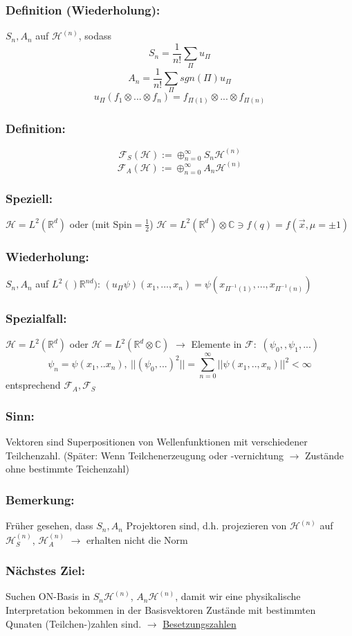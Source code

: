 \documentclass[twoside,a4paper]{scrartcl}
\newcommand{\R}{\mathbb{R}}
\newcommand{\C}{\mathbb{C}}
\renewcommand{\1}{\mathds{1}}
\newcommand{\ra}{\rightarrow}
\renewcommand{\H}{\mathcal{H}}
\newcommand{\F}{\mathcal{F}}
\renewcommand{\R}{\mathbb{R}}
\renewcommand{\C}{\mathbb{C}}
\begin{document}
\subsubsection*{Definition (Wiederholung):} 
$S_n, A_n$ auf $\H^{(n)}$, sodass 
$$S_n=\frac{1}{n!} \sum_\Pi u_\Pi$$
$$A_n=\frac{1}{n!} \sum_\Pi sgn(\Pi) u_\Pi$$
$$u_\Pi(f_1\otimes ... \otimes f_n)=f_{\Pi(1)}\otimes ... \otimes f_{\Pi(n)}$$
\subsubsection*{Definition:} 
$$\F_S(\H):=\oplus_{n=0}^\infty S_n \H^{(n)}$$
$$\F_A(\H):=\oplus_{n=0}^\infty A_n \H^{(n)}$$
\subsubsection*{Speziell:} 
$\H=L^2(\R^d)$ oder (mit Spin$=\frac{1}{2}$) $\H=L^2(\R^d)\otimes\C \ni f(q)=f(\vec x, \mu=\pm 1)$
\subsubsection*{Wiederholung:} 
$S_n,A_n$ auf $L^2()\R^{nd})$: $(u_\Pi\psi)(x_1,...,x_n)=\psi(x_{\Pi^{-1}(1)},...,x_{\Pi^{-1}(n)})$
\subsubsection*{Spezialfall:} 
$\H=L^2(\R^d)$ oder $\H=L^2(\R^d \otimes \C)$ $\ra$ Elemente in $\F:$ $(\psi_0,,\psi_1,...)$
$$\psi_n=\psi(x_1,..x_n), \ ||(\psi_0,...)^2||=\sum_{n=0}^\infty ||\psi(x_1,..,x_n)||^2 < \infty$$
entsprechend $\F_A, \F_S$
\subsubsection*{Sinn:} 
Vektoren sind Superpositionen von Wellenfunktionen mit verschiedener Teilchenzahl. (Später: Wenn Teilchenerzeugung oder -vernichtung $\ra$ Zustände ohne bestimmte Teichenzahl)
\subsubsection*{Bemerkung:} 
Früher gesehen, dass $S_n,A_n$ Projektoren sind, d.h. projezieren von $\H^{(n)}$ auf $\H^{(n)}_S$, $\H^{(n)}_A$ $\ra$ erhalten nicht die Norm
\subsubsection*{Nächstes Ziel:} 
Suchen ON-Basis in $S_n\H^{(n)}$, $A_n \H^{(n)}$, damit wir eine physikalische Interpretation bekommen in der Basisvektoren Zustände mit bestimmten Qunaten (Teilchen-)zahlen sind. $\ra$ \underline{Besetzungszahlen}
\end{document}
